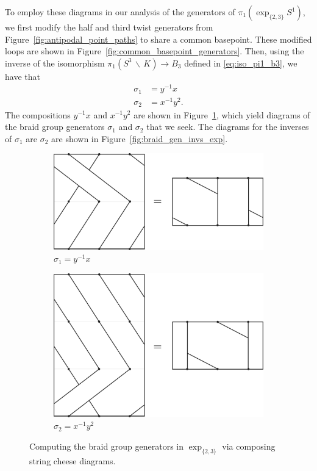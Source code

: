 \documentclass[12pt,twoside]{reedthesis}
\theoremstyle{definition}
\newcommand{\exptwothree}{\exp_{\{2,3\}}}
\newcommand{\wo}{\, \backslash \,}
\begin{document}
To employ these diagrams in our analysis of the generators of $\pi_1(\exptwothree S^1)$, we first modify the half and third twist generators from Figure~\ref{fig:antipodal_point_paths} to share a common basepoint.
These modified loops are shown in Figure~\ref{fig:common_basepoint_generators}.
Then, using the inverse of the isomorphism $\pi_1(S^3 \wo K) \to B_3$ defined in \eqref{eq:iso_pi1_b3}, we have that
\begin{align*}
  \sigma_1 &= y^{-1} x \\
  \sigma_2 &= x^{-1} y^2.
\end{align*}
The compositions $y^{-1} x$ and $x^{-1} y^2$ are shown in Figure~\ref{fig:braid_gen_equals}, which yield diagrams of the braid group generators $\sigma_1$ and $\sigma_2$ that we seek.
The diagrams for the inverses of $\sigma_1$ are $\sigma_2$ are shown in Figure~\ref{fig:braid_gen_invs_exp}.

\begin{figure}[h]
  \centering
  \begin{subfigure}[c]{0.47\textwidth}
    \centering
    \includegraphics[width=\linewidth]{figures/braid_gen_y_inv_x_equals.pdf}
    \caption{$\sigma_1 = y^{-1} x$}
  \end{subfigure}
  \hfill
  \begin{subfigure}[c]{0.47\textwidth}
    \centering
    \includegraphics[width=\linewidth]{figures/braid_gen_x_inv_y_y_equals.pdf}
    \caption{$\sigma_2 = x^{-1}y^2$}
  \end{subfigure}
  \caption{Computing the braid group generators in $\exptwothree$ via composing string cheese diagrams.}
  \label{fig:braid_gen_equals}
\end{figure}
\end{document}
